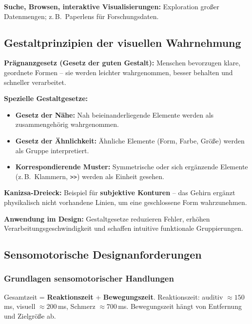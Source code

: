 \documentclass[12pt, a4paper]{article}
\begin{document}
\textbf{Suche, Browsen, interaktive Visualisierungen:} Exploration großer Datenmengen; z.\,B.\ Paperlens für Forschungsdaten.

\subsection{Gestaltprinzipien der visuellen Wahrnehmung}

\textbf{Prägnanzgesetz (Gesetz der guten Gestalt):} Menschen bevorzugen klare, geordnete Formen -- sie werden leichter wahrgenommen, besser behalten und schneller verarbeitet.

\textbf{Spezielle Gestaltgesetze:}
\begin{itemize}
  \item \textbf{Gesetz der Nähe:} Nah beieinanderliegende Elemente werden als zusammengehörig wahrgenommen.
  \item \textbf{Gesetz der Ähnlichkeit:} Ähnliche Elemente (Form, Farbe, Größe) werden als Gruppe interpretiert.
  \item \textbf{Korrespondierende Muster:} Symmetrische oder sich ergänzende Elemente (z.\,B.\ Klammern, \texttt{>>}) werden als Einheit gesehen.
\end{itemize}

\textbf{Kanizsa-Dreieck:} Beispiel für \textbf{subjektive Konturen} -- das Gehirn ergänzt physikalisch nicht vorhandene Linien, um eine geschlossene Form wahrzunehmen.

\textbf{Anwendung im Design:} Gestaltgesetze reduzieren Fehler, erhöhen Verarbeitungsgeschwindigkeit und schaffen intuitive funktionale Gruppierungen.

\subsection{Sensomotorische Designanforderungen}

\subsubsection*{Grundlagen sensomotorischer Handlungen}

Gesamtzeit = \textbf{Reaktionszeit} + \textbf{Bewegungszeit}. Reaktionszeit: auditiv $\approx 150\,$ms, visuell $\approx 200\,$ms, Schmerz $\approx 700\,$ms. Bewegungszeit hängt von Entfernung und Zielgröße ab.
\end{document}
